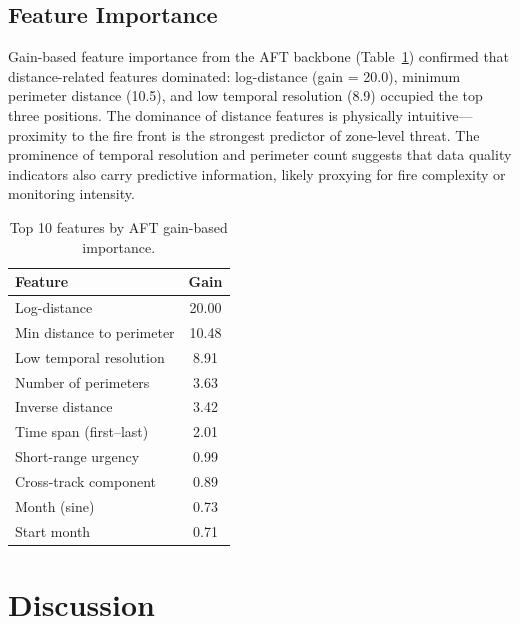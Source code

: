 \documentclass[fire,article,submit,pdftex]{../Definitions/mdpi}
\begin{document}
\subsection{Feature Importance}\label{sec:feature_importance}

Gain-based feature importance from the AFT backbone (Table~\ref{tab:feature_importance}) confirmed that distance-related features dominated: log-distance (gain = 20.0), minimum perimeter distance (10.5), and low temporal resolution (8.9) occupied the top three positions.
The dominance of distance features is physically intuitive---proximity to the fire front is the strongest predictor of zone-level threat.
The prominence of temporal resolution and perimeter count suggests that data quality indicators also carry predictive information, likely proxying for fire complexity or monitoring intensity.

\begin{table}[!ht]
\caption{Top 10 features by AFT gain-based importance.}\label{tab:feature_importance}
\begin{tabular}{lc}
\toprule
\textbf{Feature} & \textbf{Gain} \\
\midrule
Log-distance              & 20.00 \\
Min distance to perimeter & 10.48 \\
Low temporal resolution   &  8.91 \\
Number of perimeters      &  3.63 \\
Inverse distance          &  3.42 \\
Time span (first--last)   &  2.01 \\
Short-range urgency       &  0.99 \\
Cross-track component     &  0.89 \\
Month (sine)              &  0.73 \\
Start month               &  0.71 \\
\bottomrule
\end{tabular}
\end{table}

\section{Discussion}\label{sec:discussion}
\end{document}
